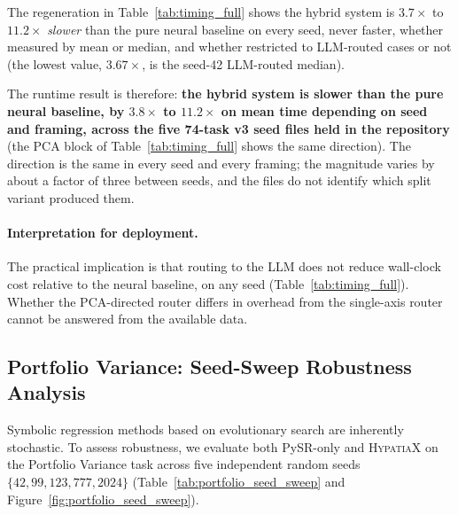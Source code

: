 \documentclass[twoside,11pt]{article}
\begin{document}
The regeneration in Table~\ref{tab:timing_full}
shows the hybrid system is $3.7\times$ to $11.2\times$ \emph{slower} than
the pure neural baseline on every seed, never faster,
whether measured by mean or median, and whether restricted to LLM-routed
cases or not (the lowest value, $3.67\times$, is the seed-42 LLM-routed median).

The runtime result is therefore: \textbf{the hybrid system
is slower than the pure neural baseline, by $3.8\times$ to $11.2\times$ on mean
time depending on seed and framing, across the five 74-task v3 seed files
held in the repository} (the PCA block of Table~\ref{tab:timing_full} shows the
same direction). The direction is the same in every seed and every
framing; the magnitude varies by about a factor of three between seeds, and
the files do not identify which split variant produced them.

\paragraph{Interpretation for deployment.}
The practical implication is that routing to the LLM does not reduce wall-clock cost relative to the neural baseline, on any seed (Table~\ref{tab:timing_full}). Whether the
PCA-directed router differs in overhead from the single-axis router cannot be
answered from the available data.


\subsection{Portfolio Variance: Seed-Sweep Robustness Analysis}\label{subsec:portfolio-variance-seedsweep-robustness-}
\label{sec:portfolio_seed_sweep}

Symbolic regression methods based on evolutionary search are inherently stochastic.
To assess robustness, we evaluate both PySR-only and \textsc{HypatiaX} on the
Portfolio Variance task across five independent random seeds
$\{42, 99, 123, 777, 2024\}$ (Table~\ref{tab:portfolio_seed_sweep} and
Figure~\ref{fig:portfolio_seed_sweep}).
\end{document}
